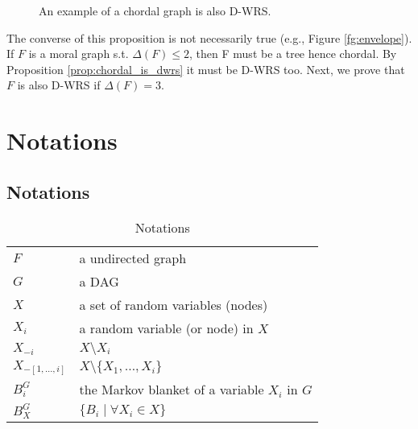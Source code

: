\begin{figure}[H]
\caption{An example of a chordal graph is also D-WRS.}
\label{fg:chordal_is_dwrs}
\end{figure}

The converse of this proposition is not necessarily true (e.g., Figure \ref{fg:envelope}). If $F$ is a moral graph s.t. $\Delta(F) \le 2$, then F must be a tree hence chordal. By Proposition \ref{prop:chordal_is_dwrs} it must be D-WRS too. Next, we prove that $F$ is also D-WRS if $\Delta(F)=3$.
\fi

\section{Notations}
\subsection{Notations}
\begin{table}[]
\centering
\caption{Notations}
\label{my-label}
\begin{tabular}{ll}
\hline
$F$ &  a undirected graph \\
$G$ & a DAG \\
$X$ & a set of random variables (nodes) \\
$X_i$ & a random variable (or node) in $X$ \\
$X_{-i}$ & $X \setminus X_i$ \\ 
$X_{-[1,\dots, i]}$ & $X \setminus \{X_1, \dots, X_i\}$ \\ 
$B_i^G$ & the Markov blanket of a variable $X_i$ in $G$ \\ 
$B_X^G$ & $\{B_i \mid \forall X_i \in X\}$ \\ \hline
\end{tabular}
\end{table}




